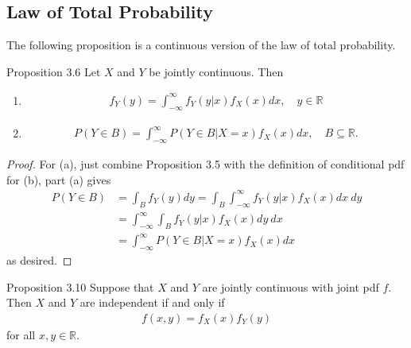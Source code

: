 \subsection{Law of Total Probability}
The following proposition is a continuous version of the law of total probability.

\begin{boks}{Proposition 3.6}
Let $X$ and $Y$ be jointly continuous. Then
\begin{enumerate}
    \item
    \begin{align*}
        f_Y(y) = \int_{-\infty}^\infty f_Y(y|x)f_X(x)dx, \quad y\in\mathbb{R}
    \end{align*}
    \item
    \begin{align*}
        P(Y \in B) = \int_{-\infty}^\infty P(Y \in B|X = x)f_X(x)dx, \quad B\subseteq\mathbb{R}.
    \end{align*}
\end{enumerate}
\end{boks}

\begin{proof}
For (a), just combine Proposition 3.5 with the definition of conditional pdf for (b), part (a) gives
\begin{align*}
    P(Y \in B) &= \int_B f_Y(y)dy = \int_B \int_{-\infty}^\infty f_Y(y|x)f_X(x)dx \ dy \\
    &= \int_{-\infty}^\infty \int_B f_Y(y|x)f_X(x)dy \ dx \\
    &= \int_{-\infty}^\infty P(Y \in B|X = x) f_X(x)dx
\end{align*}
as desired.
\end{proof}

\begin{boks}{Proposition 3.10}
Suppose that $X$ and $Y$ are jointly continuous with joint pdf $f$. Then $X$ and $Y$ are independent if and only if
\begin{align*}
    f(x, y) = f_X(x)f_Y(y)
\end{align*}
for all $x,y \in \mathbb{R}$.
\end{boks}

%
